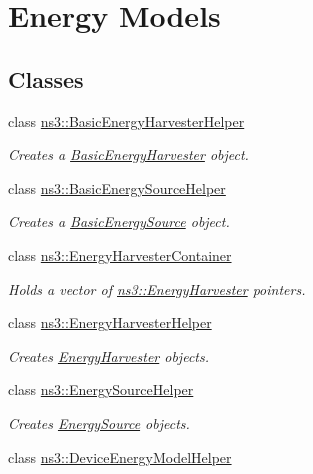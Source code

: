 \hypertarget{group__energy}{}\section{Energy Models}
\label{group__energy}
\subsection*{Classes}
\begin{DoxyCompactItemize}
\item 
class \hyperlink{classns3_1_1BasicEnergyHarvesterHelper}{ns3\+::\+Basic\+Energy\+Harvester\+Helper}
\begin{DoxyCompactList}\small\item\em Creates a \hyperlink{classns3_1_1BasicEnergyHarvester}{Basic\+Energy\+Harvester} object. \end{DoxyCompactList}\item 
class \hyperlink{classns3_1_1BasicEnergySourceHelper}{ns3\+::\+Basic\+Energy\+Source\+Helper}
\begin{DoxyCompactList}\small\item\em Creates a \hyperlink{classns3_1_1BasicEnergySource}{Basic\+Energy\+Source} object. \end{DoxyCompactList}\item 
class \hyperlink{classns3_1_1EnergyHarvesterContainer}{ns3\+::\+Energy\+Harvester\+Container}
\begin{DoxyCompactList}\small\item\em Holds a vector of \hyperlink{classns3_1_1EnergyHarvester}{ns3\+::\+Energy\+Harvester} pointers. \end{DoxyCompactList}\item 
class \hyperlink{classns3_1_1EnergyHarvesterHelper}{ns3\+::\+Energy\+Harvester\+Helper}
\begin{DoxyCompactList}\small\item\em Creates \hyperlink{classns3_1_1EnergyHarvester}{Energy\+Harvester} objects. \end{DoxyCompactList}\item 
class \hyperlink{classns3_1_1EnergySourceHelper}{ns3\+::\+Energy\+Source\+Helper}
\begin{DoxyCompactList}\small\item\em Creates \hyperlink{classns3_1_1EnergySource}{Energy\+Source} objects. \end{DoxyCompactList}\item 
class \hyperlink{classns3_1_1DeviceEnergyModelHelper}{ns3\+::\+Device\+Energy\+Model\+Helper}

\end{DoxyCompactItemize}
